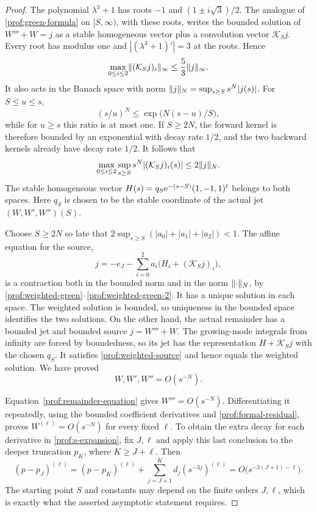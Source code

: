 \begin{proof}
The polynomial $\lambda^3+1$ has roots $-1$ and
$(1\pm i\sqrt3)/2$.  The analogue of \eqref{prof:green-formula} on
$[S,\infty)$, with these roots, writes the bounded solution of
$W'''+W=j$ as a stable homogeneous vector plus a convolution vector
$\mathcal K_Sj$.  Every root has modulus one and
$|(\lambda^3+1)'|=3$ at the roots.  Hence
\begin{equation}\label{prof:weighted-green}
 \max_{0\le i\le2}\lVert (\mathcal K_Sj)_i\rVert_\infty
 \le\frac53\lVert j\rVert_\infty.
\end{equation}
It also acts in the Banach space with norm
$\lVert j\rVert_N=\sup_{s\ge S}s^N|j(s)|$.  For $S\le u\le s$,
\[
 (s/u)^N\le\exp\bigl(N(s-u)/S\bigr),
\]
while for $u\ge s$ this ratio is at most one.  If $S\ge2N$, the
forward kernel is therefore bounded by an exponential with decay rate
$1/2$, and the two backward kernels already have decay rate $1/2$.
It follows that
\begin{equation}\label{prof:weighted-green-2}
 \max_{0\le i\le2}\sup_{s\ge S}s^N| (\mathcal K_Sj)_i(s)|
 \le2\lVert j\rVert_N.
\end{equation}
The stable homogeneous vector $H(s)=q_S\mathrm{e}^{-(s-S)}(1,-1,1)^t$
belongs to both spaces.  Here $q_S$ is chosen to be the stable coordinate
of the actual jet $(W,W',W'')(S)$.

Choose $S\ge2N$ so late that
$2\sup_{s\ge S}(|a_0|+|a_1|+|a_2|)<1$.
The affine equation for the source,
\begin{equation}\label{prof:weighted-source}
 j=-e_J-\sum_{i=0}^2a_i\bigl(H_i+(\mathcal K_Sj)_i\bigr),
\end{equation}
is a contraction both in the bounded norm and in the norm $\lVert \cdot\rVert_N$,
by \eqref{prof:weighted-green}--\eqref{prof:weighted-green-2}.
It has a unique solution in each space.  The weighted solution is bounded,
so uniqueness in the bounded space identifies the two solutions.
On the other hand, the actual remainder has a bounded jet and bounded
source $j=W'''+W$.  The growing-mode integrals from infinity are forced
by boundedness, so its jet has the representation
$H+\mathcal K_Sj$ with the chosen $q_S$.  It satisfies
\eqref{prof:weighted-source} and hence equals the weighted solution.
We have proved
\begin{equation}\label{prof:preliminary-remainder}
 W,W',W''=O(s^{-N}).
\end{equation}

Equation~\eqref{prof:remainder-equation} gives $W'''=O(s^{-N})$.
Differentiating it repeatedly, using the bounded coefficient derivatives
and \eqref{prof:formal-residual}, proves
$W^{(\ell)}=O(s^{-N})$ for every fixed $\ell$.
To obtain the extra decay for each derivative in
\eqref{prof:s-expansion}, fix $J,\ell$ and apply this last conclusion to
the deeper truncation $p_K$, where $K\ge J+\ell$.  Then
\[
 (p-p_J)^{(\ell)}
 =(p-p_K)^{(\ell)}+
   \sum_{j=J+1}^{K}d_j(s^{-3j})^{(\ell)}
 =O\bigl(s^{-3(J+1)-\ell}\bigr).
\]
The starting point $S$ and constants may depend on the finite orders
$J,\ell$, which is exactly what the asserted asymptotic statement requires.
\end{proof}

